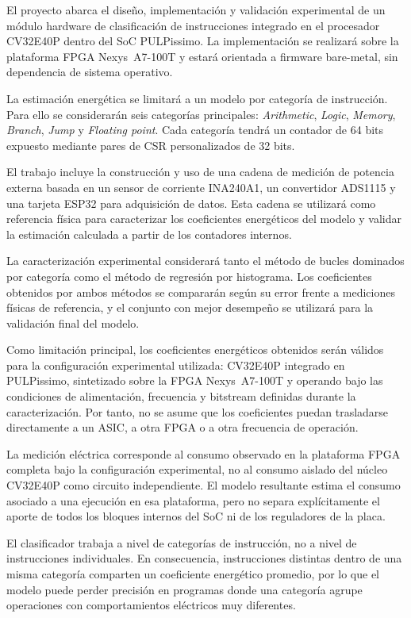 El proyecto abarca el diseño, implementación y validación experimental de un
módulo hardware de clasificación de instrucciones integrado en el procesador
CV32E40P dentro del SoC PULPissimo. La implementación se realizará sobre la
plataforma FPGA Nexys~A7-100T y estará orientada a firmware bare-metal, sin
dependencia de sistema operativo.

La estimación energética se limitará a un modelo por categoría de instrucción.
Para ello se considerarán seis categorías principales: \emph{Arithmetic},
\emph{Logic}, \emph{Memory}, \emph{Branch}, \emph{Jump} y
\emph{Floating point}. Cada categoría tendrá un contador de 64 bits expuesto mediante pares de CSR
personalizados de 32 bits.

El trabajo incluye la construcción y uso de una cadena de medición de potencia
externa basada en un sensor de corriente INA240A1, un convertidor ADS1115 y una
tarjeta ESP32 para adquisición de datos. Esta cadena se utilizará como
referencia física para caracterizar los coeficientes energéticos del modelo y
validar la estimación calculada a partir de los contadores internos.

La caracterización experimental considerará tanto el método de bucles
dominados por categoría como el método de regresión por histograma. Los
coeficientes obtenidos por ambos métodos se compararán según su error frente a mediciones
físicas de referencia, y el conjunto con mejor desempeño se utilizará para la
validación final del modelo.

Como limitación principal, los coeficientes energéticos obtenidos serán válidos
para la configuración experimental utilizada: CV32E40P integrado en PULPissimo,
sintetizado sobre la FPGA Nexys~A7-100T y operando bajo las condiciones de
alimentación, frecuencia y bitstream definidas durante la caracterización. Por
tanto, no se asume que los coeficientes puedan trasladarse directamente a un
ASIC, a otra FPGA o a otra frecuencia de operación.

La medición eléctrica corresponde al consumo observado en la plataforma FPGA
completa bajo la configuración experimental, no al consumo aislado del núcleo
CV32E40P como circuito independiente. El modelo resultante estima el consumo
asociado a una ejecución en esa plataforma, pero no separa
explícitamente el aporte de todos los bloques internos del SoC ni de los
reguladores de la placa.

El clasificador trabaja a nivel de categorías de instrucción, no a nivel de
instrucciones individuales. En consecuencia, instrucciones distintas dentro de
una misma categoría comparten un coeficiente energético promedio, por lo que el
modelo puede perder precisión en programas donde una categoría agrupe
operaciones con comportamientos eléctricos muy diferentes.

